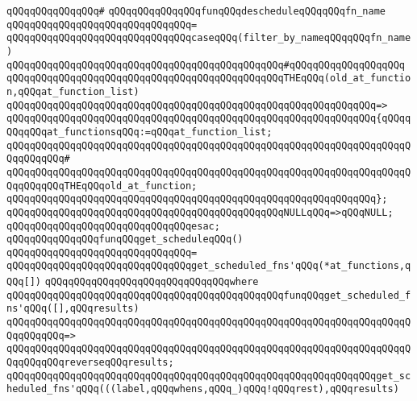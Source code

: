\verb|qQQqqQQqqQQqqQQq#|\newline
\verb|qQQqqQQqqQQqqQQqfunqQQqdescheduleqQQqqQQqfn_name|\newline
\verb|qQQqqQQqqQQqqQQqqQQqqQQqqQQqqQQq=|\newline
\verb|qQQqqQQqqQQqqQQqqQQqqQQqqQQqqQQqcaseqQQq(filter_by_nameqQQqqQQqfn_name)|\newline
\verb|qQQqqQQqqQQqqQQqqQQqqQQqqQQqqQQqqQQqqQQqqQQqqQQq#qQQqqQQqqQQqqQQqqQQq|\newline
\verb|qQQqqQQqqQQqqQQqqQQqqQQqqQQqqQQqqQQqqQQqqQQqqQQqTHEqQQq(old_at_function,qQQqat_function_list)|\newline
\verb|qQQqqQQqqQQqqQQqqQQqqQQqqQQqqQQqqQQqqQQqqQQqqQQqqQQqqQQqqQQqqQQq=>|\newline
\verb|qQQqqQQqqQQqqQQqqQQqqQQqqQQqqQQqqQQqqQQqqQQqqQQqqQQqqQQqqQQqqQQq{qQQqqQQqqQQqat_functionsqQQq:=qQQqat_function_list;|\newline
\verb|qQQqqQQqqQQqqQQqqQQqqQQqqQQqqQQqqQQqqQQqqQQqqQQqqQQqqQQqqQQqqQQqqQQqqQQqqQQqqQQq#|\newline
\verb|qQQqqQQqqQQqqQQqqQQqqQQqqQQqqQQqqQQqqQQqqQQqqQQqqQQqqQQqqQQqqQQqqQQqqQQqqQQqqQQqTHEqQQqold_at_function;|\newline
\verb|qQQqqQQqqQQqqQQqqQQqqQQqqQQqqQQqqQQqqQQqqQQqqQQqqQQqqQQqqQQqqQQq};|\newline
\newline
\verb|qQQqqQQqqQQqqQQqqQQqqQQqqQQqqQQqqQQqqQQqqQQqqQQqNULLqQQq=>qQQqNULL;|\newline
\verb|qQQqqQQqqQQqqQQqqQQqqQQqqQQqqQQqesac;|\newline
\newline
\verb|qQQqqQQqqQQqqQQqfunqQQqget_scheduleqQQq()|\newline
\verb|qQQqqQQqqQQqqQQqqQQqqQQqqQQqqQQq=|\newline
\verb|qQQqqQQqqQQqqQQqqQQqqQQqqQQqqQQqget_scheduled_fns'qQQq(*at_functions,qQQq[])|\newline
\verb|qQQqqQQqqQQqqQQqqQQqqQQqqQQqqQQqwhere|\newline
\verb|qQQqqQQqqQQqqQQqqQQqqQQqqQQqqQQqqQQqqQQqqQQqqQQqfunqQQqget_scheduled_fns'qQQq([],qQQqresults)|\newline
\verb|qQQqqQQqqQQqqQQqqQQqqQQqqQQqqQQqqQQqqQQqqQQqqQQqqQQqqQQqqQQqqQQqqQQqqQQqqQQqqQQq=>|\newline
\verb|qQQqqQQqqQQqqQQqqQQqqQQqqQQqqQQqqQQqqQQqqQQqqQQqqQQqqQQqqQQqqQQqqQQqqQQqqQQqqQQqreverseqQQqresults;|\newline
\newline
\verb|qQQqqQQqqQQqqQQqqQQqqQQqqQQqqQQqqQQqqQQqqQQqqQQqqQQqqQQqqQQqqQQqget_scheduled_fns'qQQq(((label,qQQqwhens,qQQq_)qQQq!qQQqrest),qQQqresults)|\newline
